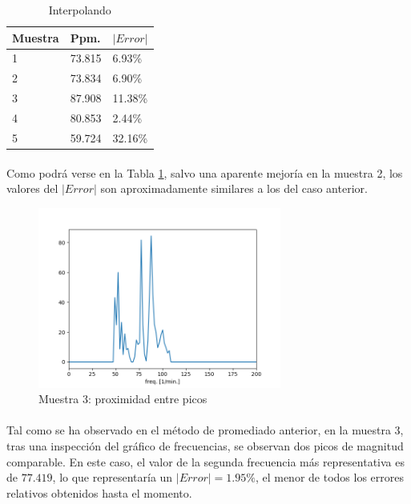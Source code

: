 \documentclass[12pt, twocolumn]{article}
\begin{document}
	\begin{table}[H]
		\centering
		\begin{tabular}{@{}lll@{}}
			\toprule
			Muestra & Ppm.   &  $|Error|$   \\ \midrule
			1       & 73.815 & 6.93\%  \\
			2       & 73.834 & 6.90\%  \\
			3       & 87.908 & 11.38\% \\
			4       & 80.853 & 2.44\%  \\
			5       & 59.724 & 32.16\% \\ \bottomrule
		\end{tabular}
		\caption{Interpolando}
		\label{inter}
	\end{table}
	
	\paragraph{} Como podrá verse en la Tabla \ref{inter}, salvo una aparente mejoría en la muestra 2, los valores del $|Error|$ son aproximadamente similares a los del caso anterior. 
	
	\begin{figure}[H]
		\centering
		\includegraphics[width=8cm]{sample3-c200_200_5.png}
		\caption{Muestra 3: proximidad entre picos}
		\label{3prox1}
	\end{figure}
	
	\paragraph{} Tal como se ha observado en el método de promediado anterior, en la muestra 3, tras una inspección del gráfico de frecuencias, se observan dos picos de magnitud comparable. En este caso, el valor de la segunda frecuencia más representativa es de $77.419$, lo que representaría un $|Error| = 1.95\%$, el menor de todos los errores relativos obtenidos hasta el momento. 
	
\end{document}
